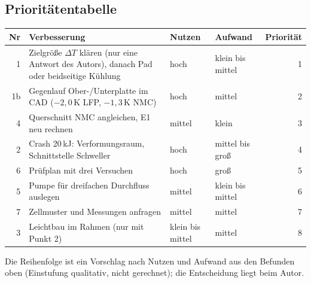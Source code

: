 \documentclass[10pt,a4paper]{article}
\begin{document}
\subsection*{Prioritätentabelle}
\begin{center}\small
\begin{tabularx}{\linewidth}{@{}rXllr@{}}\toprule
Nr & Verbesserung & Nutzen & Aufwand & Priorität\\\midrule
1 & Zielgröße $\Delta T$ klären (nur eine Antwort des Autors), danach Pad oder beidseitige Kühlung & hoch & klein bis mittel & 1\\
1b & Gegenlauf Ober-/Unterplatte im CAD ($-2{,}0$\,K LFP, $-1{,}3$\,K NMC) & hoch & mittel & 2\\
4 & Querschnitt NMC angleichen, E1 neu rechnen & mittel & klein & 3\\
2 & Crash 20\,kJ: Verformungsraum, Schnittstelle Schweller & hoch & mittel bis groß & 4\\
6 & Prüfplan mit drei Versuchen & hoch & groß & 5\\
5 & Pumpe für dreifachen Durchfluss auslegen & mittel & klein bis mittel & 6\\
7 & Zellmuster und Messungen anfragen & mittel & mittel & 7\\
3 & Leichtbau im Rahmen (nur mit Punkt 2) & klein bis mittel & mittel & 8\\\bottomrule
\end{tabularx}\end{center}
Die Reihenfolge ist ein Vorschlag nach Nutzen und Aufwand aus den Befunden oben (Einstufung qualitativ, nicht gerechnet); die Entscheidung liegt beim Autor.

\end{document}
